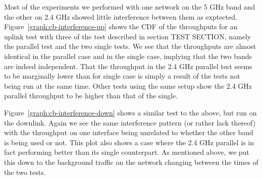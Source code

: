Most of the experiments we performed with one network on the 5 GHz band and the
other on 2.4 GHz showed little interference between them as exptected.
Figure~\ref{graph:cb-interference-up} shows the CDF of the throughputs for an
uplink test with three of the test described in section TEST SECTION, namely   %
the parallel test and the two single tests. We see that the throughputs are
almost identical in the parallel case and in the single case, implying that the
two bands are indeed independent. That the throughput in the 2.4 GHz parallel
test seems to be marginally lower than for single case is simply a result of the
tests not being run at the same time. Other tests using the same setup show the
2.4 GHz parallel throughput to be higher than that of the single.

Figure~\ref{graph:cb-interference-down} shows a similar test to the above, but
run on the downlink. Again we see the same interference pattern (or rather lack
thereof) with the throughput on one interface being unrelated to whether the
other band is being used or not. This plot also shows a case where the 2.4 GHz
parallel is in fact performing better than its single counterpart. As mentioned
above, we put this down to the background traffic on the network changing
between the times of the two tests.

